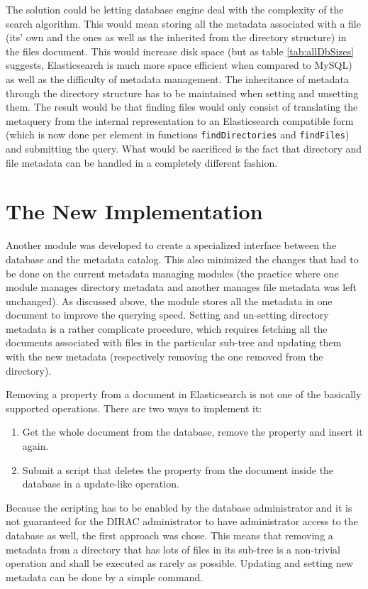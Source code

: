 The solution could be letting database engine deal 
with the complexity of the search algorithm. This would mean storing all the metadata associated with a file (its' 
own and the ones as well as the inherited from the directory structure) in the files document. This would increase
disk space (but as table \ref{tab:allDbSizes} suggests, Elasticsearch is much more space efficient when compared 
to MySQL) as well as the difficulty of metadata management. The inheritance of metadata through the directory 
structure has to be maintained when setting and unsetting them. The result would be that finding files would 
only consist of translating the metaquery from the internal representation to an Elasticsearch compatible form 
(which is now done per element in functions \texttt{findDirectories} and \texttt{findFiles}) and submitting the
query. What would be sacrificed is the fact that directory and file metadata can be handled in a completely 
different fashion.

\section{The New Implementation}

Another module was developed to create a specialized interface between the database and the metadata catalog. This 
also minimized the changes that had to be done on the current metadata managing modules (the practice where one
module manages directory metadata and another manages file metadata was left unchanged). As discussed above, the 
module stores all the metadata in one document to improve the querying speed. Setting and un-setting directory 
metadata is a rather complicate procedure, which requires fetching all the documents associated with files in
the particular sub-tree and updating them with the new metadata (respectively removing the one removed from the 
directory). 

Removing a property from a document in Elasticsearch is not one of the basically supported operations. There are 
two ways to implement it: 
\begin{enumerate}
\item Get the whole document from the database, remove the property and insert it again.
\item Submit a script that deletes the property from the document inside the database in a update-like operation.
\end{enumerate}
Because the scripting has to be enabled by the database administrator and it is not guaranteed for the DIRAC 
administrator to have administrator access to the database as well, the first approach was chose. This means that
removing a metadata from a directory that has lots of files in its sub-tree is a non-trivial operation and shall
be executed as rarely as possible. Updating and setting new metadata can be done by a simple command.

